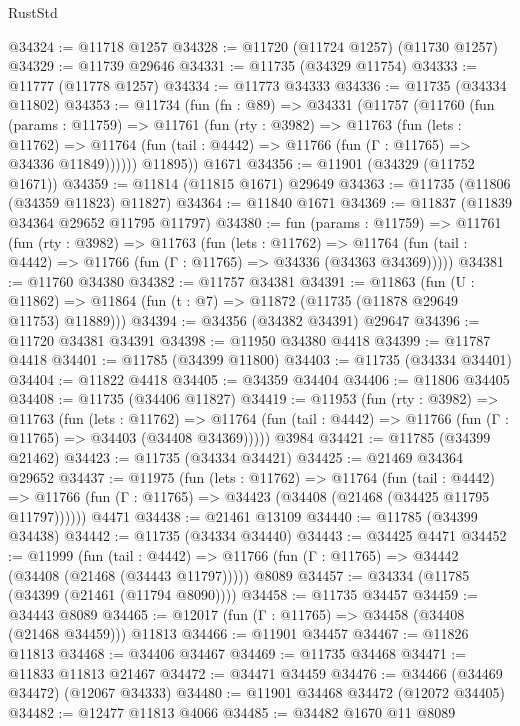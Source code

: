 \begin{lexlean}{RustStd}
\begin{coremodule}
@34324 := @11718 @1257
@34328 := @11720 (@11724 @1257) (@11730 @1257)
@34329 := @11739 @29646
@34331 := @11735 (@34329 @11754)
@34333 := @11777 (@11778 @1257)
@34334 := @11773 @34333
@34336 := @11735 (@34334 @11802)
@34353 := @11734
    (fun (fn : @89) =>
    @34331
      (@11757
        (@11760
          (fun (params : @11759) =>
          @11761
            (fun (rty : @3982) =>
            @11763
              (fun (lets : @11762) =>
              @11764 (fun (tail : @4442) => @11766 (fun (Γ : @11765) => @34336 @11849))))))
        @11895))
    @1671
@34356 := @11901 (@34329 (@11752 @1671))
@34359 := @11814 (@11815 @1671) @29649
@34363 := @11735 (@11806 (@34359 @11823) @11827)
@34364 := @11840 @1671
@34369 := @11837 (@11839 @34364 @29652 @11795 @11797)
@34380 := fun (params : @11759) =>
  @11761
    (fun (rty : @3982) =>
    @11763
      (fun (lets : @11762) =>
      @11764 (fun (tail : @4442) => @11766 (fun (Γ : @11765) => @34336 (@34363 @34369)))))
@34381 := @11760 @34380
@34382 := @11757 @34381
@34391 := @11863
    (fun (U : @11862) => @11864 (fun (t : @7) => @11872 (@11735 (@11878 @29649 @11753) @11889)))
@34394 := @34356 (@34382 @34391) @29647
@34396 := @11720 @34381 @34391
@34398 := @11950 @34380 @4418
@34399 := @11787 @4418
@34401 := @11785 (@34399 @11800)
@34403 := @11735 (@34334 @34401)
@34404 := @11822 @4418
@34405 := @34359 @34404
@34406 := @11806 @34405
@34408 := @11735 (@34406 @11827)
@34419 := @11953
    (fun (rty : @3982) =>
    @11763
      (fun (lets : @11762) =>
      @11764 (fun (tail : @4442) => @11766 (fun (Γ : @11765) => @34403 (@34408 @34369)))))
    @3984
@34421 := @11785 (@34399 @21462)
@34423 := @11735 (@34334 @34421)
@34425 := @21469 @34364 @29652
@34437 := @11975
    (fun (lets : @11762) =>
    @11764
      (fun (tail : @4442) =>
      @11766 (fun (Γ : @11765) => @34423 (@34408 (@21468 (@34425 @11795 @11797))))))
    @4471
@34438 := @21461 @13109
@34440 := @11785 (@34399 @34438)
@34442 := @11735 (@34334 @34440)
@34443 := @34425 @4471
@34452 := @11999
    (fun (tail : @4442) => @11766 (fun (Γ : @11765) => @34442 (@34408 (@21468 (@34443 @11797)))))
    @8089
@34457 := @34334 (@11785 (@34399 (@21461 (@11794 @8090))))
@34458 := @11735 @34457
@34459 := @34443 @8089
@34465 := @12017 (fun (Γ : @11765) => @34458 (@34408 (@21468 @34459))) @11813
@34466 := @11901 @34457
@34467 := @11826 @11813
@34468 := @34406 @34467
@34469 := @11735 @34468
@34471 := @11833 @11813 @21467
@34472 := @34471 @34459
@34476 := @34466 (@34469 @34472) (@12067 @34333)
@34480 := @11901 @34468 @34472 (@12072 @34405)
@34482 := @12477 @11813 @4066
@34485 := @34482 @1670 @11 @8089

\end{coremodule}
\end{lexlean}
